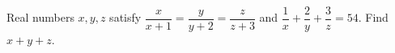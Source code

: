 Real numbers $x,y,z$ satisfy $\dfrac x{x+1}=\dfrac y{y+2}=\dfrac z{z+3}$ and $\dfrac1x+\dfrac2y+\dfrac3z=54$. Find $x+y+z$.
